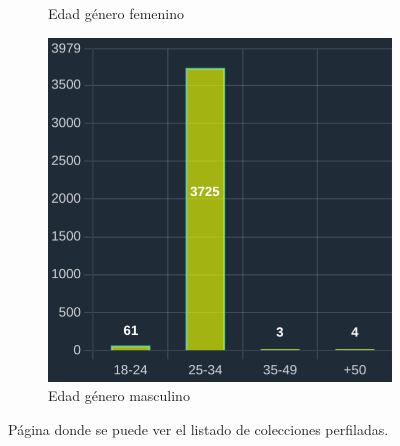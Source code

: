 \begin{figure}[H]
\begin{subfigure}{0.3\textwidth}
  \caption{Edad género femenino} 
  \end{subfigure}
  \begin{subfigure}{0.3\textwidth}
   \includegraphics[width=\textwidth]{imaxes/capturas-app/graficos/grivas/grafico-edad-grivas-masculino2.png}
  \caption{Edad género masculino} 
  \end{subfigure}
  \caption{Página donde se puede ver el listado de colecciones perfiladas.}
  \label{fig:app/colecciones}
\end{figure}
